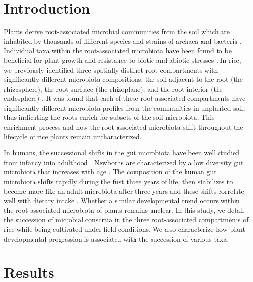 \section{Introduction}
Plants derive root-associated microbial communities from the soil which are inhabited by thousands of different species and strains of archaea and bacteria \cite{Lundberg2012,Bulgarelli2012,Peiffer2013,Edwards2015,Wagner2016}. Individual taxa within the root-associated microbiota have been found to be beneficial for plant growth and resistance to biotic and abiotic stresses \cite{Bulgarelli2013,Berendsen2012,Mendes2011}. In rice, we previously identified three spatially distinct root compartments with significantly different microbiota compositions: the soil adjacent to the root (the rhizosphere), the root surf,ace (the rhizoplane), and the root interior (the endosphere) \cite{Edwards2015}. It was found that each of these root-associated compartments have significantly different microbiota profiles from the communities in unplanted soil, thus indicating the roots enrich for subsets of the soil microbiota. This enrichment process and how the root-associated microbiota shift throughout the lifecycle of rice plants remain uncharacterized.

In humans, the successional shifts in the gut microbiota have been well studied from infancy into adulthood \cite{Koenig2011,Mueller2015,Backhed2015,Yatsunenko2012}. Newborns are characterized by a low diversity gut microbiota that increases with age \cite{Koenig2011}. The composition of the human gut microbiota shifts rapidly during the first three years of life, then stabilizes to become more like an adult microbiota after three years and these shifts correlate well with dietary intake \cite{Yatsunenko2012}. Whether a similar developmental  trend occurs within the root-associated microbiota of plants remains unclear. In this study, we detail the succession of microbial consortia in the three root-associated compartments of rice while being cultivated under field conditions. We also characterize how plant developmental progression is associated with the succession of various taxa.

\section{Results}
